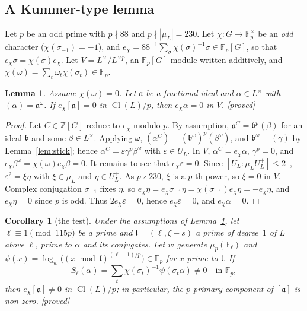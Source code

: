 \documentclass[11pt,a4paper]{amsart}
\theoremstyle{plain}
\newtheorem{lemma}[theorem]{Lemma}
\newtheorem{corollary}[theorem]{Corollary}
\theoremstyle{definition}
\newcommand{\Z}{\mathbb{Z}}
\newcommand{\F}{\mathbb{F}}
\newcommand{\aaa}{\mathfrak{a}}
\newcommand{\bb}{\mathfrak{b}}
\newcommand{\lpr}{\mathfrak{l}}
\DeclareMathOperator{\Cl}{Cl}
\newcommand{\st}[1]{\textup{\textsf{\small[#1]}}}
\newcommand{\DEM}{\st{proved}}
\begin{document}
\subsection{A Kummer-type lemma}
Let $p$ be an odd prime with $p\nmid 88$ and $p\nmid|\mu_L|=230$. Let $\chi\colon G\to\F_p^\times$ be an \emph{odd} character ($\chi(\sigma_{-1})=-1$), and $e_\chi=88^{-1}\sum_\sigma\chi(\sigma)^{-1}\sigma\in\F_p[G]$, so that $e_\chi\sigma=\chi(\sigma)e_\chi$. Let $V=L^\times/L^{\times p}$, an $\F_p[G]$-module written additively, and $\chi(\omega)=\sum_t\omega_t\chi(\sigma_t)\in\F_p$.

\begin{lemma}\label{lem:kummer}
Assume $\chi(\omega)=0$. Let $\aaa$ be a fractional ideal and $\alpha\in L^\times$ with $(\alpha)=\aaa^\omega$. If $e_\chi[\aaa]=0$ in $\Cl(L)/p$, then $e_\chi\alpha=0$ in $V$. \DEM
\end{lemma}

\begin{proof}
Let $C\in\Z[G]$ reduce to $e_\chi$ modulo $p$. By assumption, $\aaa^C=\bb^p(\beta)$ for an ideal $\bb$ and some $\beta\in L^\times$. Applying $\omega$, $(\alpha^C)=(\bb^\omega)^p(\beta^\omega)$, and $\bb^\omega=(\gamma)$ by Lemma~\ref{lem:stick}; hence $\alpha^C=\varepsilon\gamma^p\beta^\omega$ with $\varepsilon\in U_L$. In $V$, $\alpha^C=e_\chi\alpha$, $\gamma^p=0$, and $e_\chi\beta^\omega=\chi(\omega)e_\chi\beta=0$. It remains to see that $e_\chi\varepsilon=0$. Since $[U_L:\mu_LU_L^+]\le2$~\cite[Thm.~4.12]{Was97}, $\varepsilon^2=\xi\eta$ with $\xi\in\mu_L$ and $\eta\in U_L^+$. As $p\nmid230$, $\xi$ is a $p$-th power, so $\xi=0$ in $V$. Complex conjugation $\sigma_{-1}$ fixes $\eta$, so $e_\chi\eta=e_\chi\sigma_{-1}\eta=\chi(\sigma_{-1})e_\chi\eta=-e_\chi\eta$, and $e_\chi\eta=0$ since $p$ is odd. Thus $2e_\chi\varepsilon=0$, hence $e_\chi\varepsilon=0$, and $e_\chi\alpha=0$.
\end{proof}

\begin{corollary}[the test]\label{cor:test}
Under the assumptions of Lemma~\ref{lem:kummer}, let $\ell\equiv1\pmod{115p}$ be a prime and $\lpr=(\ell,\zeta-s)$ a prime of degree~$1$ of $L$ above $\ell$, prime to $\alpha$ and its conjugates. Let $w$ generate $\mu_p(\F_\ell)$ and $\psi(x)=\log_w\bigl((x\bmod\lpr)^{(\ell-1)/p}\bigr)\in\F_p$ for $x$ prime to $\lpr$. If
\[
S_\ell(\alpha)=\sum_t\chi(\sigma_t)^{-1}\psi(\sigma_t\alpha)\neq0\quad\text{in }\F_p,
\]
then $e_\chi[\aaa]\neq0$ in $\Cl(L)/p$; in particular, the $p$-primary component of $[\aaa]$ is non-zero. \DEM
\end{corollary}
\end{document}
